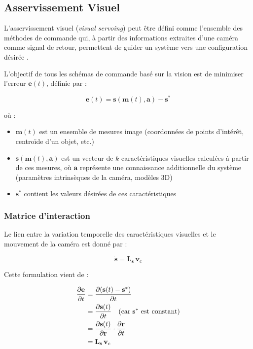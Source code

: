 \subsection{Asservissement Visuel}



L'asservissement visuel (\textit{visual servoing}) peut être défini comme  l'ensemble des méthodes de commande qui, à partir des informations extraites d'une caméra comme signal de retour, permettent de guider un système vers une configuration désirée \cite{ref6}. 



L'objectif de tous les schémas de commande basé sur la vision est de minimiser l'erreur $\mathbf{e}(t)$, définie par \cite{ref6} :

\begin{equation}
    \mathbf{e}(t) = \mathbf{s}(\mathbf{m}(t), \mathbf{a}) - \mathbf{s}^*
    \label{eq:erreur_visuelle}
\end{equation}

où :
\begin{itemize}[noitemsep, topsep=4pt]
    \item $\mathbf{m}(t)$ est un ensemble de mesures image (coordonnées 
    de points d'intérêt, centroïde d'un objet, etc.)
    \item $\mathbf{s}(\mathbf{m}(t), \mathbf{a})$ est un vecteur de $k$ 
    caractéristiques visuelles calculées à partir de ces mesures, où 
    $\mathbf{a}$ représente une connaissance additionnelle du système 
    (paramètres intrinsèques de la caméra, modèles 3D)
    \item $\mathbf{s}^*$ contient les valeurs désirées de ces 
    caractéristiques
\end{itemize}

\subsubsection{Matrice d'interaction}

Le lien entre la variation temporelle des caractéristiques visuelles et 
le mouvement de la caméra est donné par \cite{ref6} :

\begin{equation}
    \dot{\mathbf{s}} = \mathbf{L_s} \, \mathbf{v}_c
    \label{eq:matrice_interaction}
\end{equation}


Cette formulation vient de :

\begin{align}
    \frac{\partial \mathbf{e}}{\partial t} 
    &= \frac{\partial (\mathbf{s}(t) - \mathbf{s}^*)}{\partial t} \notag \\
    &= \frac{\partial \mathbf{s}(t)}{\partial t} \quad (\text{car} \; \mathbf{s}^* \text{ est constant}) \notag \\
    &= \frac{\partial \mathbf{s}(t)}{\partial \mathbf{r}} \cdot 
    \frac{\partial \mathbf{r}}{\partial t} \notag \\
    &= \mathbf{L_s} \, \mathbf{v}_c 
\end{align}

